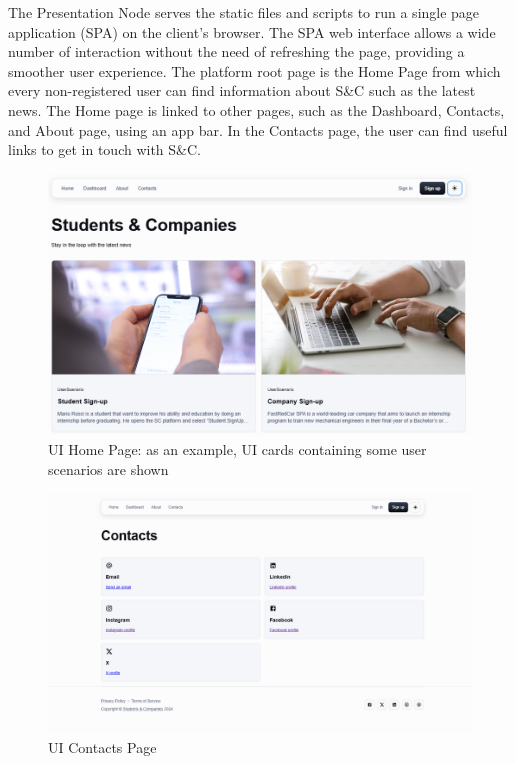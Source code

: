 The Presentation Node serves the static files and scripts to run a single page application (SPA) on the client's browser.
The SPA web interface allows a wide number of interaction without the need of refreshing the page, providing a smoother user experience. The platform root page is the Home Page from which every non-registered user can find information about S\&C such as the latest news. The Home page is linked to other pages, such as the Dashboard, Contacts, and About page, using an app bar. 
In the Contacts page, the user can find useful links to get in touch with S\&C.\\
\begin{figure}[H]
    \centering
    \includegraphics[width=\textwidth]{Latex/Images/UI/v1/HomePage.png}
    \caption{UI Home Page: as an example, UI cards containing some user scenarios are shown}
    \label{fig:homepage}
\end{figure}
\begin{figure}[H]
    \centering
    \includegraphics[width=\textwidth]{Latex/Images/UI/v2/Contacts.png}
    \caption{UI Contacts Page}
    \label{fig:contactpage}
\end{figure}
